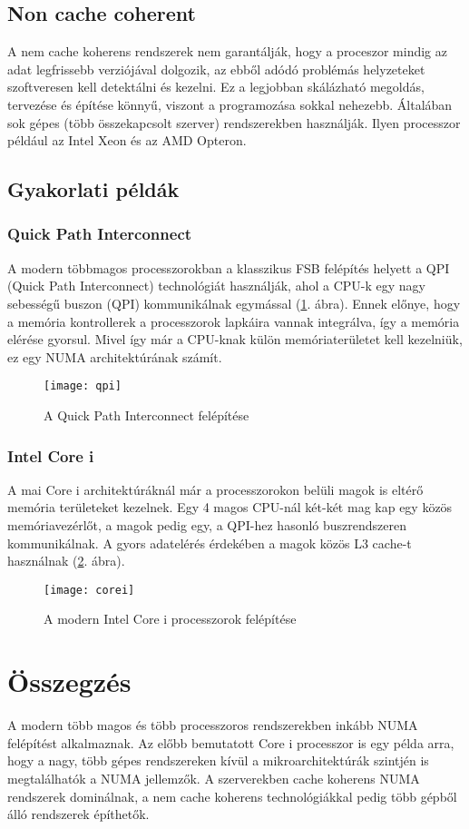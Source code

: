 \subsection{Non cache coherent}
A nem cache koherens rendszerek nem garantálják, hogy a proceszor mindig az adat legfrissebb verziójával dolgozik, az ebből adódó problémás helyzeteket szoftveresen kell detektálni és kezelni.
Ez a legjobban skálázható megoldás, tervezése és építése könnyű, viszont a programozása sokkal nehezebb.
Általában sok gépes (több összekapcsolt szerver) rendszerekben használják.
Ilyen processzor például az Intel Xeon és az AMD Opteron.

\subsection{Gyakorlati példák}
\subsubsection{Quick Path Interconnect}
A modern többmagos processzorokban a klasszikus FSB felépítés helyett a QPI (Quick Path Interconnect) technológiát használják, ahol a CPU-k egy nagy sebességű buszon (QPI) kommunikálnak egymással (\ref{fig:qpi}. ábra).
Ennek előnye, hogy a memória kontrollerek a processzorok lapkáira vannak integrálva, így a memória elérése gyorsul.
Mivel így már a CPU-knak külön memóriaterületet kell kezelniük, ez egy NUMA architektúrának számít.
\begin{figure}[H]
    \texttt{[image: qpi]}
    \centering
    \caption{A Quick Path Interconnect felépítése}
    \label{fig:qpi}
\end{figure}
\subsubsection{Intel Core i}
A mai Core i architektúráknál már a processzorokon belüli magok is eltérő memória területeket kezelnek.
Egy 4 magos CPU-nál két-két mag kap egy közös memóriavezérlőt, a magok pedig egy, a QPI-hez hasonló buszrendszeren kommunikálnak.
A gyors adatelérés érdekében a magok közös L3 cache-t használnak (\ref{fig:corei}. ábra).
\begin{figure}[H]
    \texttt{[image: corei]}
    \centering
    \caption{A modern Intel Core i processzorok felépítése}
    \label{fig:corei}
\end{figure}

\section{Összegzés}
A modern több magos és több processzoros rendszerekben inkább NUMA felépítést alkalmaznak.
Az előbb bemutatott Core i processzor is egy példa arra, hogy a nagy, több gépes rendszereken kívül a mikroarchitektúrák szintjén is megtalálhatók a NUMA jellemzők.
A szerverekben cache koherens NUMA rendszerek dominálnak, a nem cache koherens technológiákkal pedig több gépből álló rendszerek építhetők.